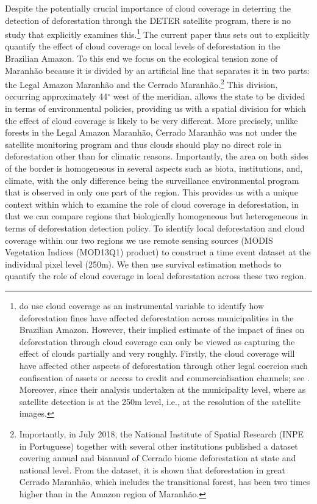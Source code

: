 Despite the potentially crucial importance of cloud coverage in deterring the detection of deforestation through the DETER satellite program, there is no study that explicitly examines this.\footnote{\cite{ASSUNCAO_2017} do use cloud coverage as an instrumental variable to identify how deforestation fines have affected deforestation across municipalities in the Brazilian Amazon.  However, their implied estimate of the impact of fines on deforestation through cloud coverage can only be viewed as capturing the effect of clouds partially and very roughly.  Firstly, the cloud coverage will have affected other aspects of deforestation through other legal coercion such confiscation of assets or access to credit and commercialisation channels; see \citep{borner2015post}.  Moreover, since their analysis undertaken at the municipality level, where as satellite detection is at the 250m level, i.e., at the resolution of the satellite images.}  The current paper thus sets out to explicitly quantify the effect of cloud coverage on local levels of deforestation in the Brazilian Amazon. To this end we focus on the ecological tension zone of Maranhão because it is divided by an artificial line that separates it in two parts: the Legal Amazon Maranhão and the Cerrado Maranhão.\footnote{Importantly, in July 2018, the National Institute of Spatial Research (INPE in Portuguese) together with several other institutions published a dataset covering annual and biannual of Cerrado biome deforestation at state and national level. From the dataset, it is shown that deforestation in great Cerrado Maranhão, which includes the transitional forest, has been two times higher than in the Amazon region of Maranhão.} This division, occurring approximately 44$^{\circ}$ west of the meridian, allows the state to be divided in terms of environmental policies, providing us with a spatial division for which the effect of cloud coverage is likely to be very different.  More precisely, unlike forests in the Legal Amazon Maranhão,  Cerrado Maranhão was not under the satellite monitoring program and thus clouds should play no direct role in deforestation other than for climatic reasons. Importantly, the area on both sides of the border is homogeneous in several aspects such as biota, institutions, and, climate,  with the only difference being the surveillance environmental program that is observed in only one part of the region. This provides us with a unique context within which to examine the role of cloud coverage in deforestation, in that we can compare regions that biologically homogeneous but heterogeneous in terms of deforestation detection policy.  To identify local deforestation and cloud coverage within our two regions we use remote sensing sources (MODIS Vegetation Indices (MOD13Q1) product) to construct a time event dataset at the individual pixel level (250m). We then use survival estimation methods to quantify the role of cloud coverage in local deforestation across these two region.    

